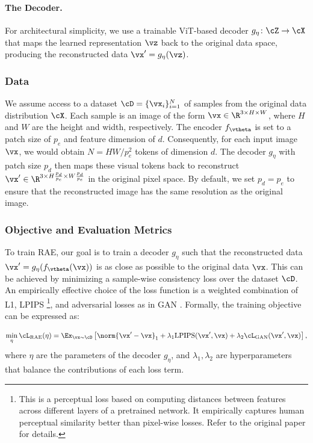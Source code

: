 \documentclass[../../book-main.tex]{subfiles}
\begin{document}
\paragraph{The Decoder.} For architectural simplicity, we use a
trainable ViT-based decoder \(g_{\eta} \colon \cZ \to \cX\) that maps the
learned representation \(\vz\) back to the original data space,
producing the reconstructed data \(\vx' = g_{\eta}(\vz)\).

\subsubsection{Data}
We assume access to a dataset \(\cD = \{\vx_i\}_{i=1}^N\) of samples
from the original data distribution \(\cX\).
Each sample is an image of
the form \(\vx \in \R^{3 \times H \times W}\), where \(H\) and \(W\) are the
height and width, respectively.
The encoder \(f_{\vtheta}\) is set to a patch
size of \(p_e\) and feature dimension of \(d\).
Consequently, for each
input image \(\vx\), we would obtain \(N = HW/p_e^2\) tokens of dimension
\(d\).
The decoder \(g_{\eta}\) with patch size \(p_d\) then maps these visual
tokens back to reconstruct \(\vx' \in \R^{3 \times H\frac{p_d}{p_e}
\times W\frac{p_d}{p_e}}\) in the original pixel space.
By default, we
set \(p_d = p_e\) to ensure that the reconstructed image has the same
resolution as the original image.

\subsubsection{Objective and Evaluation Metrics} To train RAE, our goal
is to train a decoder \(g_{\eta}\) such that the reconstructed data \(\vx' =
g_{\eta}(f_{\vtheta}(\vx))\) is as close as possible to the original data \(\vx\).
This can
be achieved by minimizing a sample-wise consistency loss over the
dataset \(\cD\).
An empirically effective choice of the loss function
is a weighted combination of L1, LPIPS \citep{zhang2018unreasonable}\footnote{This is a perceptual loss based on computing distances
between features across different layers of a pretrained network.
It
empirically captures human perceptual similarity better than
pixel-wise losses. Refer to the original paper for details.}, and
adversarial losses as in GAN \citep{goodfellow2014generative}.
Formally, the training objective can be expressed as:

\begin{equation}
\min_{\eta} \cL_{\text{RAE}}(\eta) = \Ex_{\vx \sim \cD} \left[
    \norm{\vx' - \vx}_1 + \lambda_1 \mathrm{LPIPS}(\vx', \vx) + \lambda_2
\cL_{\text{GAN}}(\vx', \vx) \right] ,
\end{equation}
where \(\eta\) are the parameters of the decoder \(g_{\eta}\), and \(\lambda_1,
\lambda_2\) are hyperparameters that balance the contributions of each loss term.
\end{document}
